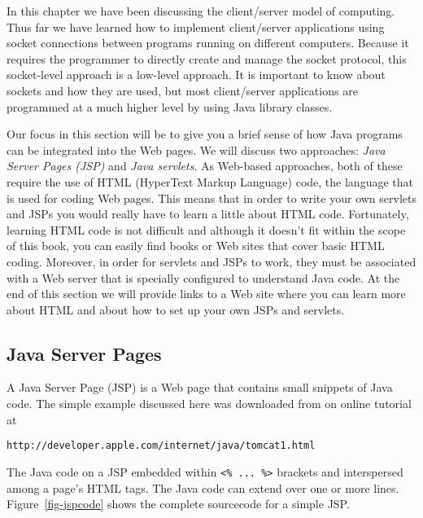 In this chapter we have been discussing the client/server model of
computing.  Thus far we have learned how to implement client/server
applications using socket connections between programs running on
different computers. Because it requires the programmer to directly
create and manage the socket protocol, this socket-level approach is a
low-level approach.  It is important to know about sockets and how
they are used, but most client/server applications are programmed at a
much higher level by using Java library classes.

Our focus in this section will be to give you a brief sense of how
Java programs can be integrated into the Web pages. We will discuss
two approaches: {\em Java Server Pages (JSP)} and {\em Java servlets}.  As
Web-based approaches, both of these require the use of HTML (HyperText
Markup Language) code, the language that is used for coding Web
pages. This means that in order to write your own servlets and JSPs
you would really have to learn a little about HTML code.  Fortunately,
learning HTML code is not difficult and although it doesn't fit within
the scope of this book, you can easily find books or Web sites that
cover basic HTML coding.  Moreover, in order for servlets and JSPs to
work, they must be associated with a Web server that is specially
configured to understand Java code.  At the end of this section we
will provide links to a Web site where you can learn more about HTML
and about how to set up your own JSPs and servlets.

\subsection{Java Server Pages}

A Java Server Page (JSP) is a Web page that contains small snippets of
Java code.  The simple example discussed here was downloaded from on
online tutorial at 

\begin{jjjlisting}
\begin{lstlisting}[commentstyle=\color{black}]
 http://developer.apple.com/internet/java/tomcat1.html
\end{lstlisting}
\end{jjjlisting}

\noindent The Java code on a JSP embedded within {\tt <\% ... \%>}
brackets and interspersed among a page's HTML tags. The Java code can
extend over one or more lines. Figure~\ref{fig-jspcode} shows the
complete sourcecode for a simple JSP.

